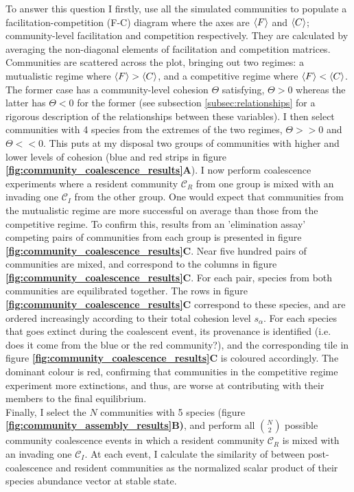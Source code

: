 \documentclass[titlepage,11pt]{article}
\begin{document}
\begin{linenumbers}
\begin{singlespace}
To answer this question I firstly, use all the simulated communities to populate a facilitation-competition (F-C) diagram where the axes are  $ \braket{F} $ and $ \braket{C}$; community-level facilitation and competition respectively. They are calculated by averaging the non-diagonal elements of facilitation and competition matrices. Communities are scattered across the plot, bringing out two regimes: a mutualistic regime where $  \braket{F} > \braket{C} $, and a competitive regime where $ \braket{F} < \braket{C} $. The former case has a community-level cohesion $ \Theta $ satisfying, $  \Theta > 0$ whereas the latter has $ \Theta < 0 $ for the former (see subsection \ref{subsec:relationships} for a rigorous description of the relationships between these variables). I then select communities with 4 species from the extremes of the two regimes, $ \Theta >> 0 $ and $ \Theta << 0 $. This puts at my disposal two groups of communities with higher and lower levels of cohesion (blue and red strips in figure \textbf{\ref{fig:community_coalescence_results}A}). I now perform coalescence experiments where a resident community $\mathcal{C}_R$  from one group is mixed with an invading one $ \mathcal{C}_I $ from the other group. One would expect that communities from the mutualistic regime are more successful on average than those from the competitive regime. To confirm this, results from an 'elimination assay' competing pairs of communities from each group is presented in figure \textbf{\ref{fig:community_coalescence_results}C}. Near five hundred pairs of communities are mixed, and correspond to the columns in figure  \textbf{\ref{fig:community_coalescence_results}C}. For each pair, species from both communities are equilibrated together. The rows in figure \textbf{\ref{fig:community_coalescence_results}C} correspond to these species, and are ordered increasingly according to their total cohesion level $ s_{\alpha} $. For each species that goes extinct during the coalescent event, its provenance is identified (i.e. does it come from the blue or the red community?), and the corresponding tile in figure \textbf{\ref{fig:community_coalescence_results}C} is coloured accordingly. The dominant colour is red, confirming that communities in the competitive regime experiment more extinctions, and thus, are worse at contributing with their members to the final equilibrium.\\
Finally, I select the $ N $ communities with 5 species (figure \textbf{\ref{fig:community_assembly_results}B)}, and perform  all $ {N}\choose{2} $ possible community coalescence events in which a resident community $\mathcal{C}_R$ is mixed with an invading one $ \mathcal{C}_I $. At each event, I calculate the similarity of between post-coalescence and resident communities as the normalized scalar product of their species abundance vector at stable state.

\end{singlespace}
\end{linenumbers}
\end{document}
